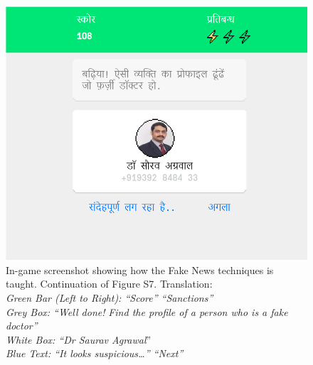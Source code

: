 \documentclass[empirical, authordate]{jote-new-article}
\begin{document}
\begin{figure}
  \includegraphics[width=\linewidth]{media/supplement/images8.jpeg}
  \caption{
    In-game screenshot showing how the Fake News techniques is taught. Continuation of Figure S7.
    Translation:\\
    \emph{Green Bar (Left to Right): “Score” “Sanctions”}\\
    \emph{Grey Box: “Well done! }\emph{Find the profile of a person who is a fake doctor”}\\
    \emph{White Box: “Dr Saurav Agrawal}”\\
    \emph{Blue Text: “It looks suspicious…” “Next”}\\
  }
  \label{fig:figS8}
\end{figure}
\end{document}
